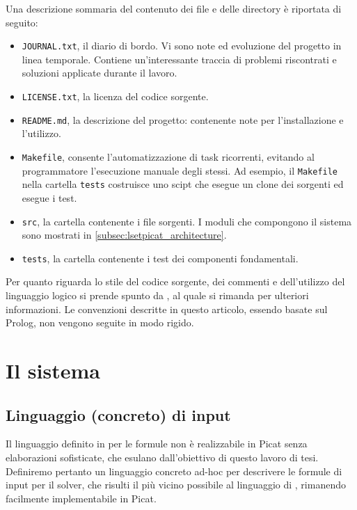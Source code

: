 \documentclass[12pt,a4paper,openright]{book}  %
\begin{document}
Una descrizione sommaria del contenuto dei file e delle directory è
riportata di seguito:
\begin{itemize}
	\item \texttt{JOURNAL.txt}, il diario di bordo. Vi sono note
          ed evoluzione del progetto in linea temporale. Contiene
          un'interessante traccia di problemi riscontrati e soluzioni
          applicate durante il lavoro.
	\item \texttt{LICENSE.txt}, la licenza del codice sorgente.
	\item \texttt{README.md}, la descrizione del progetto:
          contenente note per l'installazione e l'utilizzo.
	\item \texttt{Makefile}, consente l'automatizzazione di task
          ricorrenti, evitando al programmatore l'esecuzione manuale
          degli stessi. Ad esempio, il \texttt{Makefile} nella
          cartella \texttt{tests} costruisce uno scipt che esegue un
          clone dei sorgenti ed esegue i test.
	\item \texttt{src}, la cartella contenente i file sorgenti. I
          moduli che compongono il sistema sono mostrati in
          \ref{subsec:lsetpicat_architecture}.
	\item \texttt{tests}, la cartella contenente i test dei
          componenti fondamentali.
\end{itemize}

Per quanto riguarda lo stile del codice sorgente, dei commenti e
dell'utilizzo del linguaggio logico si prende spunto da
\cite{Covington12}, al quale si rimanda per ulteriori informazioni. Le
convenzioni descritte in questo articolo, essendo basate sul Prolog,
non vengono seguite in modo rigido.

\section{Il sistema}
\label{sec:lsetpicat_system}

\subsection{Linguaggio (concreto) di input}
\label{subsec:lsetpicat_concretelang}

Il linguaggio definito in \lset{} per le formule non è realizzabile in
Picat senza elaborazioni sofisticate, che esulano dall’obiettivo di
questo lavoro di tesi. Definiremo pertanto un linguaggio concreto
ad-hoc per descrivere le formule di input per il solver, che risulti
il più vicino possibile al linguaggio di \lset{}, rimanendo facilmente
implementabile in Picat.
\end{document}
